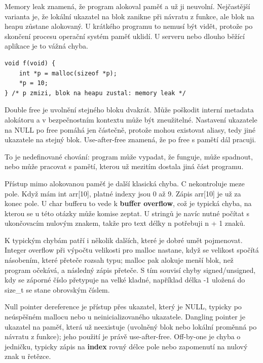 Memory leak znamená, že program alokoval paměť a už ji neuvolní. Nejčastější varianta je, že lokální ukazatel na blok zanikne při návratu z funkce, ale blok na heapu zůstane alokovaný. U krátkého programu to nemusí být vidět, protože po skončení procesu operační systém paměť uklidí. U serveru nebo dlouho běžící aplikace je to vážná chyba.

\begin{codebox}
\small
\begin{verbatim}
void f(void) {
    int *p = malloc(sizeof *p);
    *p = 10;
} /* p zmizi, blok na heapu zustal: memory leak */
\end{verbatim}
\end{codebox}

Double free je uvolnění stejného bloku dvakrát. Může poškodit interní metadata alokátoru a v bezpečnostním kontextu může být zneužitelné. Nastavení ukazatele na NULL po free pomáhá jen částečně, protože mohou existovat aliasy, tedy jiné ukazatele na stejný blok. Use-after-free znamená, že po free s pamětí dál pracuji.

To je nedefinované chování: program může vypadat, že funguje, může spadnout, nebo může pracovat s pamětí, kterou už mezitím dostala jiná část programu.

Přístup mimo alokovanou paměť je další klasická chyba. C nekontroluje meze pole. Když mám int arr[10], platné indexy jsou 0 až 9. Zápis arr[10] je už za konec pole. U char bufferu to vede k \textbf{buffer overflow}, což je typická chyba, na kterou se u této otázky může komise zeptat. U stringů je navíc nutné počítat s ukončovacím nulovým znakem, takže pro text délky n potřebuji n + 1 znaků.

K typickým chybám patří i několik dalších, které je dobré umět pojmenovat. Integer overflow při výpočtu velikosti pro malloc nastane, když se velikost spočítá násobením, které přeteče rozsah typu; malloc pak alokuje menší blok, než program očekává, a následný zápis přeteče. S tím souvisí chyby signed/unsigned, kdy se záporné číslo přetypuje na velké kladné, například délka -1 uložená do size\_t se stane obrovským číslem.

Null pointer dereference je přístup přes ukazatel, který je NULL, typicky po neúspěšném mallocu nebo u neinicializovaného ukazatele. Dangling pointer je ukazatel na paměť, která už neexistuje (uvolněný blok nebo lokální proměnná po návratu z funkce); jeho použití je právě use-after-free. Off-by-one je chyba o jedničku, typicky zápis na \textbf{index} rovný délce pole nebo zapomenutí na nulový znak u řetězce.

